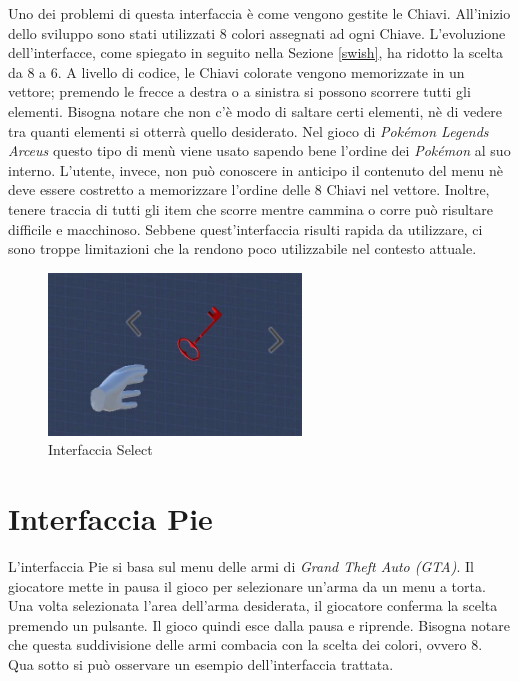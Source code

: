\documentclass[target=bach,aauheader=]{thud}
\begin{document}
Uno dei problemi di questa interfaccia è come vengono gestite le Chiavi.
All'inizio dello sviluppo sono stati utilizzati 8 colori assegnati ad ogni Chiave.
L'evoluzione dell'interfacce, come spiegato in seguito nella Sezione \ref{swish}, ha ridotto la scelta da 8 a 6.
A livello di codice, le Chiavi colorate vengono memorizzate in un vettore; premendo le frecce a destra o a sinistra si possono scorrere tutti gli elementi.
Bisogna notare che non c'è modo di saltare certi elementi, nè di vedere tra quanti elementi si otterrà quello desiderato.
Nel gioco di \textit{Pokémon Legends Arceus} questo tipo di menù viene usato sapendo bene l'ordine dei \textit{Pokémon} al suo interno.
L'utente, invece, non può conoscere in anticipo il contenuto del menu nè deve essere costretto a memorizzare l'ordine delle 8 Chiavi nel vettore.
Inoltre, tenere traccia di tutti gli item che scorre mentre cammina o corre può risultare difficile e macchinoso.
Sebbene quest'interfaccia risulti rapida da utilizzare, ci sono troppe limitazioni che la rendono poco utilizzabile nel contesto attuale.

\begin{figure}[h]
    \centering
    \includegraphics[width=0.60\textwidth]{select}
    \caption{Interfaccia Select}
    \label{fig:select}
\end{figure}


\section{Interfaccia Pie} %
\label{pie}
L'interfaccia Pie si basa sul menu delle armi di \textit{Grand Theft Auto (GTA)}.
Il giocatore mette in pausa il gioco per selezionare un'arma da un menu a torta.
Una volta selezionata l'area dell'arma desiderata, il giocatore conferma la scelta premendo un pulsante.
Il gioco quindi esce dalla pausa e riprende.
Bisogna notare che questa suddivisione delle armi combacia con la scelta dei colori, ovvero 8. 
Qua sotto si può osservare un esempio dell'interfaccia trattata.
\end{document}
